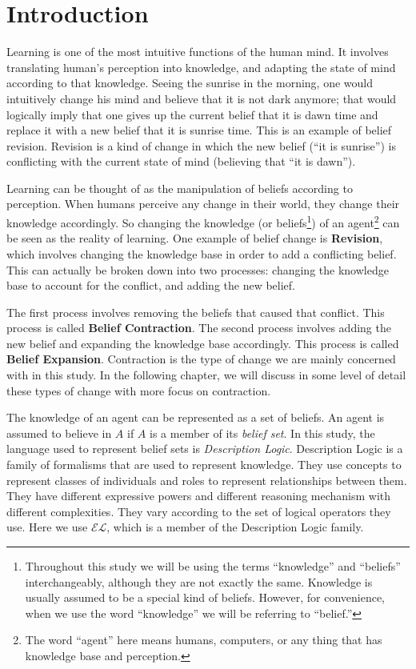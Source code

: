 \chapter{Introduction}

Learning is one of the most intuitive functions of the human mind. It involves translating human's perception into knowledge, and adapting the state of mind according to that knowledge. Seeing the sunrise in the morning, one would intuitively change his mind and believe that it is not dark anymore; that would logically imply that one gives up the current belief that it is dawn time and replace it with a new belief that it is sunrise time. This is an example of belief revision. Revision is a kind of change in which the new belief (``it is sunrise'') is conflicting with the current state of mind (believing that ``it is dawn''). 

Learning can be thought of as the manipulation of beliefs according to perception. When humans perceive any change in their world, they change their knowledge accordingly. So changing the knowledge (or beliefs\footnote{Throughout this study we will be using the terms ``knowledge'' and ``beliefs'' interchangeably, although they are not exactly the same. Knowledge is usually assumed to be a special kind of beliefs. However, for convenience, when we use the word ``knowledge'' we will be referring to ``belief.'' }) of an agent\footnote{The word ``agent'' here means humans, computers, or any thing that has knowledge base and perception.} can be seen as the reality of learning. One example of belief change is \textbf{Revision}, which involves changing the knowledge base in order to add a conflicting belief. This can actually be broken down into two processes: changing the knowledge base to account for the conflict, and adding the new belief. 

The first process involves removing the beliefs that caused that conflict. This process is called \textbf{Belief Contraction}. The second process involves adding the new belief and expanding the knowledge base accordingly. This process is called \textbf{Belief Expansion}. Contraction is the type of change we are mainly concerned with in this study. In the following chapter, we will discuss in some level of detail these types of change with more focus on contraction.

The knowledge of an agent can be represented as a set of beliefs. An agent is assumed to believe in $A$ if $A$ is a member of its \textit{belief set}. In this study, the language used to represent belief sets is \textit{Description Logic}. Description Logic is a family of formalisms that are used to represent knowledge. They use concepts to represent classes of individuals and roles to represent relationships between them. They have different expressive powers and different reasoning mechanism with different complexities. They vary according to the set of logical operators they use. Here we use $\mathcal{EL}$, which is a member of the Description Logic family.

